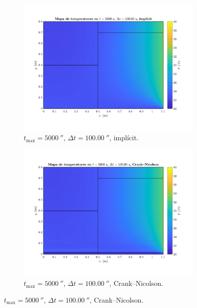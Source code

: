 \begin{figure}[ht]
\begin{subfigure}{.5\textwidth}
		\label{fig:esquema_4}
	\end{subfigure}
	\begin{subfigure}{.5\textwidth}
		\centering
		\includegraphics[width=.95\linewidth]{imagenes/04_analisi_influencia_dades_numeriques/esquema/esquema_5.pdf}
		\vspace{-15pt}
		\caption{$t_\text{max} = 5000 \ \second$, $\Delta t = 100.00 \ \second$, implícit.}
		\label{fig:esquema_5}
	\end{subfigure}%
	\begin{subfigure}{.5\textwidth}
		\centering
		\includegraphics[width=.95\linewidth]{imagenes/04_analisi_influencia_dades_numeriques/esquema/esquema_6.pdf}
		\vspace{-15pt}
		\caption{$t_\text{max} = 5000 \ \second$, $\Delta t = 100.00 \ \second$, Crank--Nicolson.}

\end{subfigure}
\end{figure}
